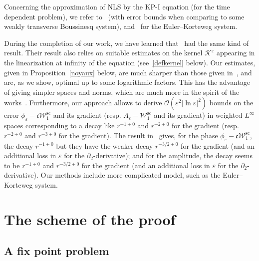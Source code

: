 \documentclass[AHL,Unicode,longabstracts,published]{cedram}
\newcommand*\p{\partial}
\renewcommand{\sc}{\mathrm{sc}}
\newcommand*\BO{\mathcal{O}}
\newcommand*\BK{\mathcal{K}}
\newcommand*\BW{\mathcal{W}}
\newcommand*\cs{{\mathfrak c}}
\newcommand*\ii{\infty}
\newcommand*\e{\varepsilon}
\newcommand*\lne{\lvert \ln \varepsilon \rvert}
\begin{document}
Concerning the approximation of NLS by the KP-I equation (for the time dependent problem), we refer to~\cite{Chi-Rou,Cerror} (with error bounds when comparing to some weakly transverse Boussinesq system), and~\cite{Ben_Chi} for the Euler--Korteweg system.



During the completion of our work, we have learned that~\cite{LWWY} had the same kind of result. Their result also relies on suitable estimates on the kernel $ \BK^\e $ appearing in the linearization at infinity of the equation (see~\eqref{defkernel} below). Our estimates, given in Proposition~\ref{noyaux} below, are much sharper than those given in~\cite[Lemmas~3.1 and 3.2]{LWWY}, and are, as we show, optimal up to some logarithmic factors. This has the advantage of giving simpler spaces and norms, which are much more in the spirit of the works~\cite{BGStranso2d,CM1}. Furthermore, our approach allows to derive $ \BO (\e^2 \lne^2) $ bounds on the error $ \phi_\e - \cs \BW_1^{\sc} $ and its gradient (resp. $ A_\e - \BW_1^{\sc} $ and its gradient) in weighted $ L^\ii $ spaces corresponding to a decay like $ r^{-1+0} $ and $ r^{-2+0} $ for the gradient (resp. $ r^{-2+0} $ and $ r^{-3+0} $ for the gradient). The result in~\cite{LWWY} gives, for the phase $ \phi_\e - \cs \BW_1^{\sc} $, the decay $ r^{-1+0} $ but they have the weaker decay $ r^{-3/2 + 0 } $ for the gradient (and an additional loss in $ \e $ for the $ \p_2 $-derivative); and for the amplitude, the decay seems to be $ r^{-1+0} $ and $ r^{-3/2 + 0 } $ for the gradient (and an additional loss in $ \e $ for the $ \p_2 $-derivative). Our methods include more complicated model, such as the Euler--Korteweg system.



\section{The scheme of the proof}


\subsection{A fix point problem}
\end{document}
